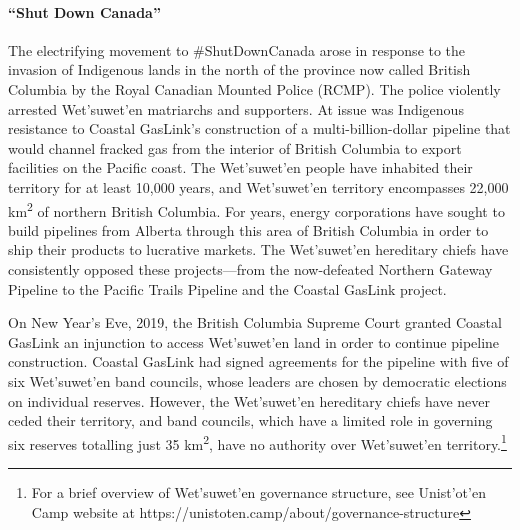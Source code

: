 \paragraph{``Shut Down Canada''}

The electrifying movement to \#ShutDownCanada arose in response to the invasion of Indigenous lands in the north of the province now called British Columbia by the Royal Canadian Mounted Police (RCMP). The police violently arrested Wet'suwet'en matriarchs and supporters. At issue was Indigenous resistance to Coastal GasLink's construction of a multi-billion-dollar pipeline that would channel fracked gas from the interior of British Columbia to export facilities on the Pacific coast. The Wet'suwet'en people have inhabited their territory for at least 10,000 years, and Wet'suwet'en territory encompasses 22,000 km\textsuperscript{2} of northern British Columbia. For years, energy corporations have sought to build pipelines from Alberta through this area of British Columbia in order to ship their products to lucrative markets. The Wet'suwet'en hereditary chiefs have consistently opposed these projects---from the now-defeated Northern Gateway Pipeline to the Pacific Trails Pipeline and the Coastal GasLink project.

On New Year's Eve, 2019, the British Columbia Supreme Court granted Coastal GasLink an injunction to access Wet'suwet'en land in order to continue pipeline construction. Coastal GasLink had signed agreements for the pipeline with five of six Wet'suwet'en band councils, whose leaders are chosen by democratic elections on individual reserves. However, the Wet'suwet'en hereditary chiefs have never ceded their territory, and band councils, which have a limited role in governing six reserves totalling just 35 km\textsuperscript{2}, have no authority over Wet'suwet'en territory.\footnote{For a brief overview of Wet'suwet'en governance structure, see Unist'ot'en Camp website at https://unistoten.camp/about/governance-structure}

